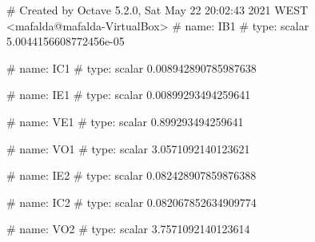 # Created by Octave 5.2.0, Sat May 22 20:02:43 2021 WEST <mafalda@mafalda-VirtualBox>
# name: IB1
# type: scalar
5.0044156608772456e-05


# name: IC1
# type: scalar
0.008942890785987638


# name: IE1
# type: scalar
0.00899293494259641


# name: VE1
# type: scalar
0.899293494259641


# name: VO1
# type: scalar
3.0571092140123621


# name: IE2
# type: scalar
0.082428907859876388


# name: IC2
# type: scalar
0.082067852634909774


# name: VO2
# type: scalar
3.7571092140123614


